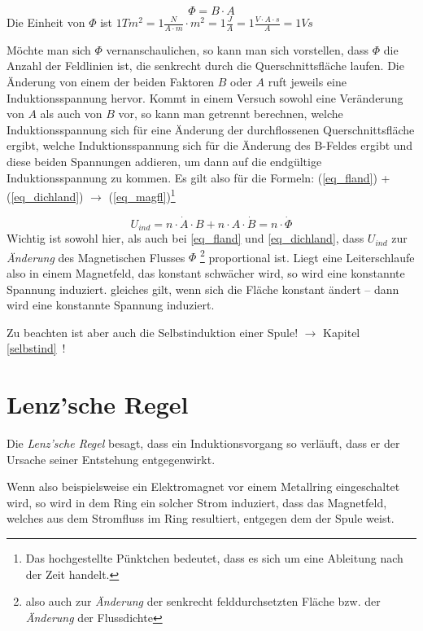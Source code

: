 \begin{equation}
\Phi = B \cdot A
\end{equation}
Die Einheit von \(\Phi\) ist \(1 Tm^2 = 1 \frac{N}{A \cdot m} \cdot m^2 = 1 \frac{J}{A} = 1\frac{V \cdot A \cdot s}{A} = 1 V s\)

Möchte man sich \(\Phi\) vernanschaulichen, so kann man sich vorstellen, dass \(\Phi\) die Anzahl der Feldlinien ist, die senkrecht durch die Querschnittsfläche laufen. Die Änderung von einem der beiden Faktoren \(B\) oder \(A\) ruft jeweils eine Induktionsspannung hervor. Kommt in einem Versuch sowohl eine Veränderung von \(A\) als auch von \(B\) vor, so kann man getrennt berechnen, welche Induktionsspannung sich für eine Änderung der durchflossenen Querschnittsfläche ergibt, welche Induktionsspannung sich für die Änderung des B-Feldes ergibt und diese beiden Spannungen addieren, um dann auf die endgültige Induktionsspannung zu kommen. Es gilt also für die Formeln: (\ref{eq_fland}) + (\ref{eq_dichland}) \(\rightarrow\) (\ref{eq_magfl})\footnote{Das hochgestellte Pünktchen bedeutet, dass es sich um eine Ableitung nach der Zeit handelt.}

\begin{equation}
U_{ind} = n \cdot \dot{A} \cdot B + n \cdot A \cdot \dot{B} = n \cdot \dot{\Phi}
\label{eq_magfl}
\end{equation}
Wichtig ist sowohl hier, als auch bei \ref{eq_fland} und \ref{eq_dichland}, dass \(U_{ind}\) zur \emph{Änderung} des Magnetischen Flusses \(\Phi\)
\footnote{also auch zur \emph{Änderung} der senkrecht felddurchsetzten Fläche bzw. der \emph{Änderung} der Flussdichte}
proportional ist. Liegt eine Leiterschlaufe also in einem Magnetfeld, das konstant schwächer wird, so wird eine konstannte Spannung induziert. gleiches gilt, wenn sich die Fläche konstant ändert -- dann wird eine konstannte Spannung induziert.

Zu beachten ist aber auch die Selbstinduktion einer Spule! \(\rightarrow\) Kapitel \ref{selbstind}~!



		\section{Lenz'sche Regel}
		\label{kap_lenzsche_regel}

Die \textit{Lenz'sche Regel} besagt, dass ein Induktionsvorgang so verläuft, dass er der Ursache seiner Entstehung entgegenwirkt. 

Wenn also beispielsweise ein Elektromagnet vor einem Metallring eingeschaltet wird, so wird in dem Ring ein solcher Strom induziert, dass das Magnetfeld, welches aus dem Stromfluss im Ring resultiert, entgegen dem der Spule weist.

